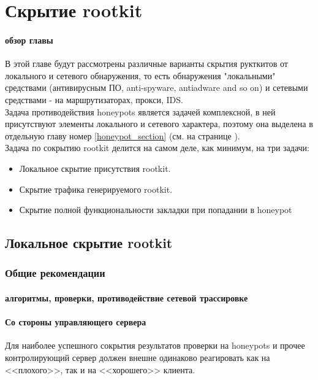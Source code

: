 \section{Скрытие rootkit}
\label{section_rk_evasion}

\paragraph{обзор главы\\}

В этой главе будут рассмотрены различные варианты скрытия рукткитов от
локального и сетевого обнаружения, то есть обнаружения "локальными"
средствами (антивирусным ПО, anti-spyware, antiadware and so on) и
сетевыми средствами - на маршрутизаторах, прокси, IDS.\\

Задача противодействия honeypots является задачей комплексной, в ней
присутствуют элементы локального и сетевого характера, поэтому она
выделена в отдельную главу номер \ref{honeypot_section} (см. на
странице \pageref{honeypot_section_page} ).\\

Задача по сокрытию rootkit делится на самом деле, как минимум, на три
задачи:

\begin{itemize}
\item{Локальное скрытие присутствия rootkit.}
\item{Скрытие трафика генерируемого rootkit.}
\item{Скрытие полной функциональности закладки при попадании в honeypot}
\end{itemize}

\subsection{Локальное скрытие rootkit}

\subsubsection{Общие рекомендации}

\paragraph{алгоритмы, проверки, противодействие сетевой трассировке\\}

\paragraph{Со стороны управляющего сервера\\}
Для наиболее успешного сокрытия результатов проверки на honeypots и
прочее контролирующий сервер должен внешне одинаково реагировать как на
<<плохого>>, так и на <<хорошего>> клиента.\\

